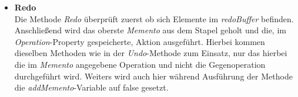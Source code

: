 \begin{itemize}
\item \textbf{Redo}\\
Die Methode \textit{Redo} überprüft zuerst ob sich Elemente im \textit{redoBuffer} befinden. Anschließend wird das oberste \textit{Memento} aus dem Stapel geholt und die, im \textit{Operation}-Property gespeicherte, Aktion ausgeführt. Hierbei kommen dieselben Methoden wie in der \textit{Undo}-Methode zum Einsatz, nur das hierbei die im \textit{Memento} angegebene Operation und nicht die Gegenoperation durchgeführt wird. Weiters wird auch hier während Ausführung der Methode die \textit{addMemento}-Variable auf false gesetzt.
\end{itemize}

